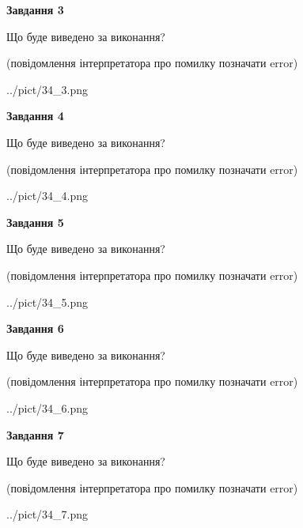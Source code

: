 \documentclass[12pt, ukrainian]{article}
\begin{document}
{\begin {large}
{\begin {center}\textbf{Завдання 3}\end {center}}\par
Що буде виведено за виконання?\par
 (повідомлення інтерпретатора про помилку позначати error)\par
\begin{center}
	{../pict/34_3.png}
\end{center}
\newpage

{\begin {center}\textbf{Завдання 4}\end {center}}\par
Що буде виведено за виконання?\par
 (повідомлення інтерпретатора про помилку позначати error)\par
\begin{center}
	{../pict/34_4.png}
\end{center}
\newpage

{\begin {center}\textbf{Завдання 5}\end {center}}\par
Що буде виведено за виконання?\par
 (повідомлення інтерпретатора про помилку позначати error)\par
\begin{center}
	{../pict/34_5.png}
\end{center}
\newpage

{\begin {center}\textbf{Завдання 6}\end {center}}\par
Що буде виведено за виконання?\par
 (повідомлення інтерпретатора про помилку позначати error)\par
\begin{center}
	{../pict/34_6.png}
\end{center}
\newpage

{\begin {center}\textbf{Завдання 7}\end {center}}\par
Що буде виведено за виконання?\par
 (повідомлення інтерпретатора про помилку позначати error)\par
\begin{center}
	{../pict/34_7.png}
\end{center}
\newpage


\end{large}}
\end{document}
